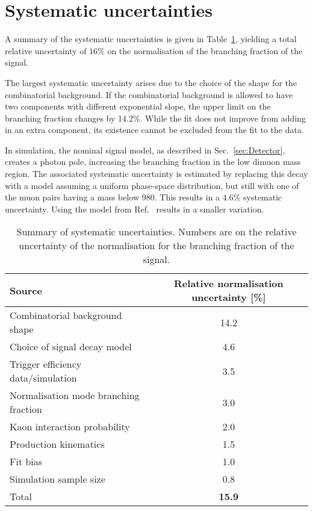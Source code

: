 \section{Systematic uncertainties}
\label{sec:systematics}

A summary of the systematic uncertainties is given in Table~\ref{tab:systematicsummary}, yielding a total relative uncertainty of $16\%$ on the normalisation of the branching fraction of the signal.


The largest systematic uncertainty arises due to the choice of the shape for the combinatorial background. If the combinatorial background is allowed to have two components with different exponential slope, the upper limit on the branching fraction changes by 14.2\%. While the fit does not improve from adding in an extra component, its existence cannot be excluded from the fit to the data.

In simulation, the nominal signal model, as described in Sec.~\ref{sec:Detector}, creates a photon pole, increasing the branching fraction in the low dimuon mass region. The associated systematic uncertainty is estimated by replacing this decay with a model assuming a uniform phase-space distribution, but still with one of the muon pairs having a mass below 980\mevcc. This results in a $4.6\%$ systematic uncertainty. Using the model from Ref.~\cite{Danilina:2018uzr} results in a smaller variation.

\begin{table}[tb]
\centering
\caption{Summary of systematic uncertainties. Numbers are on the relative uncertainty of the normalisation for the branching fraction of the signal.}
\label{tab:systematicsummary}
\begin{tabular}{ l  c }
\hline
Source & Relative normalisation uncertainty [\%] \\
\hline
Combinatorial background shape & 14.2 \\
Choice of signal decay model  & \phantom{0}4.6\\
Trigger efficiency data/simulation &  \phantom{0}3.5\\
Normalisation mode branching fraction & \phantom{0}3.0 \\
Kaon interaction probability &  \phantom{0}2.0\\
Production kinematics & \phantom{0}1.5\\
Fit bias & \phantom{0}1.0  \\
Simulation sample size & \phantom{0}0.8 \\
 \hline
Total & \textbf{15.9} \\
\end{tabular}
\end{table}

